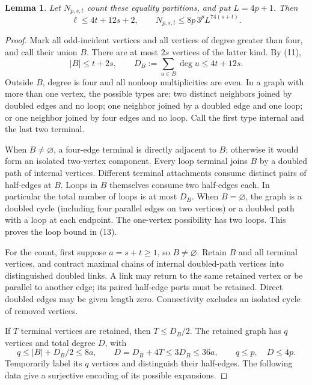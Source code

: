 \documentclass[11pt]{article}
\newtheorem{lemma}[theorem]{Lemma}
\theoremstyle{definition}
\begin{document}
\begin{lemma}\label{lem:count}
Let \(N_{p,s,t}\) count these equality partitions, and put \(L=4p+1\).
Then
\[
 \ell\le4t+12s+2,\qquad
                N_{p,s,t}\le8p\,3^p L^{74(s+t)}.                 \tag{13}
\]
\end{lemma}
\begin{proof}
Mark all odd-incident vertices and all vertices of degree greater
than four, and call their union \(B\). There are at most \(2s\)
vertices of the latter kind. By (11),
\[
 |B|\le t+2s,\qquad D_B:=\sum_{u\in B}\deg u\le4t+12s.            \tag{14}
\]
Outside \(B\), degree is four and all nonloop multiplicities are
even. In a graph with more than one vertex, the possible types are:
two distinct neighbors joined by doubled edges and no loop;
one neighbor joined by a doubled edge and one loop; or one neighbor
joined by four edges and no loop. Call the first type internal and
the last two terminal.

When \(B\ne\varnothing\), a four-edge terminal is directly adjacent
to \(B\); otherwise it would form an isolated two-vertex component.
Every loop terminal joins \(B\) by a doubled path of internal
vertices. Different terminal attachments consume distinct pairs
of half-edges at \(B\). Loops in \(B\) themselves consume two
half-edges each. In particular the total number of loops is at most
\(D_B\). When \(B=\varnothing\), the graph is a doubled cycle
(including four parallel edges on two vertices) or a doubled path
with a loop at each endpoint. The one-vertex possibility has two
loops. This proves the loop bound in (13).

For the count, first suppose \(a=s+t\ge1\), so \(B\ne\varnothing\).
Retain \(B\) and all terminal vertices, and contract maximal chains
of internal doubled-path vertices into distinguished doubled links.
A link may return to the same retained vertex or be parallel to
another edge; its paired half-edge ports must be retained.
Direct doubled edges may be given length zero. Connectivity excludes
an isolated cycle of removed vertices.

If \(T\) terminal vertices are retained, then \(T\le D_B/2\).
The retained graph has \(q\) vertices and total degree \(D\), with
\[
 q\le |B|+D_B/2\le8a,\qquad
 D=D_B+4T\le3D_B\le36a,\qquad q\le p,\quad D\le4p.                \tag{15}
\]
Temporarily label its \(q\) vertices and distinguish their half-edges.
The following data give a surjective encoding of its possible
expansions.


\end{proof}
\end{document}
